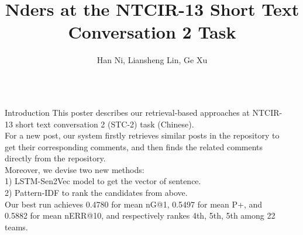 \documentclass[final,hyperref={pdfpagelabels=false}]{beamer}
\title[]{Nders at the NTCIR-13 Short Text Conversation 2 Task}
\author[]{Han Ni, Liansheng Lin, Ge Xu}
\institute[ND]{NetDragon WebSoft Inc.}
\begin{document}
  \begin{frame}{} 
    
      \begin{columns}[t]
        \begin{column}{.49\linewidth}
          \begin{block}{\large Introduction}
            This poster describes our retrieval-based approaches at NTCIR-13 short text conversation 2 
            (STC-2) task (Chinese). \\
            For a new post, our system firstly retrieves similar posts 
            in the repository to get their corresponding comments, and then finds the 
            related comments directly from the repository. \\ 
            Moreover, we devise two new methods: \\
            1) LSTM-Sen2Vec model to get the vector of sentence. \\
            2) Pattern-IDF to rank the candidates from above. \\
            Our best run achieves 0.4780 for mean nG@1, 
            0.5497 for mean P+, and 0.5882 for mean nERR@10, and respectively rankes 4th, 
            5th, 5th among 22 teams.
          \end{block}
        \end{column}
        \begin{column}{.49\linewidth}
\end{column}
\end{columns}
\end{frame}
\end{document}

